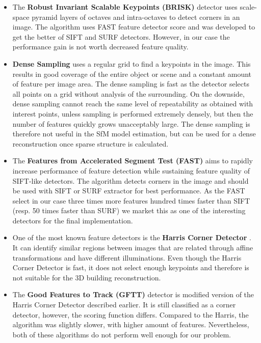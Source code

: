 \begin{itemize}
	\item The \textbf{Robust Invariant Scalable Keypoints (BRISK)} detector uses scale-space pyramid layers of octaves and intra-octaves to detect corners in an image. The algorithm uses FAST feature detector score and was developed to get the better of SIFT and SURF detectors. However, in our case the performance gain is not worth decreased feature quality. \cite{article:brisk}
	
	\item \textbf{Dense Sampling} uses a regular grid to find a keypoints in the image. This results in good coverage of the entire object or scene and a constant amount of feature per image area. The dense sampling is fast as the detector selects all points on a grid without analysis of the surrounding. On the downside, dense sampling cannot reach the same level of repeatability as obtained with interest points, unless sampling is performed extremely densely, but then the number of features quickly grows unacceptably large. The dense sampling is therefore not useful in the SfM model estimation, but can be used for a dense reconstruction once sparse structure is calculated. \cite{article:dense}
	
	\item The \textbf{Features from Accelerated Segment Test (FAST)} aims to rapidly increase performance of feature detection while sustaining feature quality of SIFT-like detectors. The algorithm detects corners in the image and should be used with SIFT or SURF extractor for best performance. As the FAST select in our case three times more features hundred times faster than SIFT (resp. 50 times faster than SURF) we market this as one of the interesting detectors for the final implementation. \cite{article:fast}
	
	\item One of the most known feature detectors is the \textbf{Harris Corner Detector} . It can identify similar regions between images that are related through affine transformations and have different illuminations. Even though the Harris Corner Detector is fast, it does not select enough keypoints and therefore is not suitable for the 3D building reconstruction. \cite{www:harris}
	
	\item The \textbf{Good Features to Track (GFTT)} detector is modified version of the Harris Corner Detector described earlier. It is still classified as a corner detector, however, the scoring function differs. Compared to the Harris, the algorithm was slightly slower, with higher amount of features. Nevertheless, both of these algorithms do not perform well enough for our problem. \cite{article:gftt}
	

\end{itemize}
